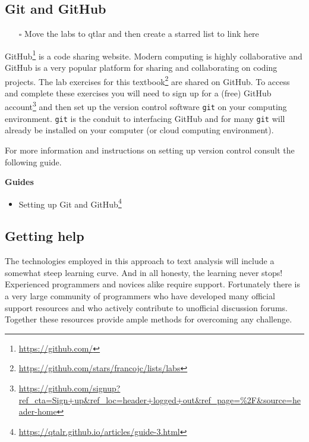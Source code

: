 \documentclass[
  letterpaper,
]{latex/krantz}
\providecommand{\tightlist}{%
  \setlength{\itemsep}{0pt}\setlength{\parskip}{0pt}}\usepackage{longtable,booktabs,array}
\DeclareRobustCommand{\href}[2]{#2\footnote{\url{#1}}}
\begin{document}
\hypertarget{git-and-github}{%
\subsection*{Git and GitHub}\label{git-and-github}}

\begin{itemize}
\tightlist
\item[$\square$]
  Move the labs to qtlar and then create a starred list to link here
\end{itemize}

\href{https://github.com/}{GitHub} is a code sharing website. Modern
computing is highly collaborative and GitHub is a very popular platform
for sharing and collaborating on coding projects. The
\href{https://github.com/stars/francojc/lists/labs}{lab exercises for
this textbook} are shared on GitHub. To access and complete these
exercises you will need to
\href{https://github.com/signup?ref_cta=Sign+up\&ref_loc=header+logged+out\&ref_page=\%2F\&source=header-home}{sign
up for a (free) GitHub account} and then set up the version control
software \texttt{git} on your computing environment. \texttt{git} is the
conduit to interfacing GitHub and for many \texttt{git} will already be
installed on your computer (or cloud computing environment).

For more information and instructions on setting up version control
consult the following guide.

\begin{tcolorbox}[enhanced jigsaw, arc=.35mm, leftrule=.75mm, rightrule=.15mm, opacityback=0, colback=white, breakable, bottomrule=.15mm, left=2mm, toprule=.15mm]

\textbf{ Guides}

\begin{itemize}
\tightlist
\item
  \href{https://qtalr.github.io/articles/guide-3.html}{Setting up Git
  and GitHub}
\end{itemize}

\end{tcolorbox}

\hypertarget{getting-help}{%
\subsection*{Getting help}\label{getting-help}}

The technologies employed in this approach to text analysis will include
a somewhat steep learning curve. And in all honesty, the learning never
stops! Experienced programmers and novices alike require support.
Fortunately there is a very large community of programmers who have
developed many official support resources and who actively contribute to
unofficial discussion forums. Together these resources provide ample
methods for overcoming any challenge.
\end{document}
